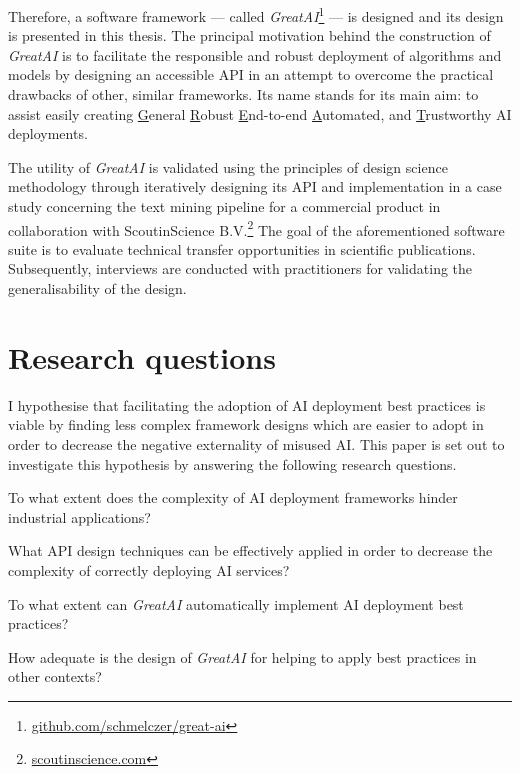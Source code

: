 Therefore, a software framework --- called \textit{GreatAI}\footnote{\href{https://github.com/schmelczer/great-ai}{github.com/schmelczer/great-ai}} --- is designed and its design is presented in this thesis. The principal motivation behind the construction of \textit{GreatAI} is to facilitate the responsible and robust deployment of algorithms and models by designing an accessible API in an attempt to overcome the practical drawbacks of other, similar frameworks. Its name stands for its main aim: to assist easily creating \underline{G}eneral \underline{R}obust \underline{E}nd-to-end \underline{A}utomated, and \underline{T}rustworthy AI deployments.

The utility of \textit{GreatAI} is validated using the principles of design science methodology \cite{wieringa2014design} through iteratively designing its API and implementation in a case study concerning the text mining pipeline for a commercial product in collaboration with ScoutinScience B.V.\footnote{\href{https://scoutinscience.com/}{scoutinscience.com}} The goal of the aforementioned software suite is to evaluate technical transfer opportunities in scientific publications. Subsequently, interviews are conducted with practitioners for validating the generalisability of the design.

\section{Research questions}

I hypothesise that facilitating the adoption of AI deployment best practices is viable by finding less complex framework designs which are easier to adopt in order to decrease the negative externality of misused AI. This paper is set out to investigate this hypothesis by answering the following research questions. 

\begin{rqlist}
  \item To what extent does the complexity of AI deployment frameworks hinder industrial applications?
  \item What API design techniques can be effectively applied in order to decrease the complexity of correctly deploying AI services?
  \item To what extent can \textit{GreatAI} automatically implement AI deployment best practices?
  \item How adequate is the design of \textit{GreatAI} for helping to apply best practices in other contexts?
\end{rqlist}

